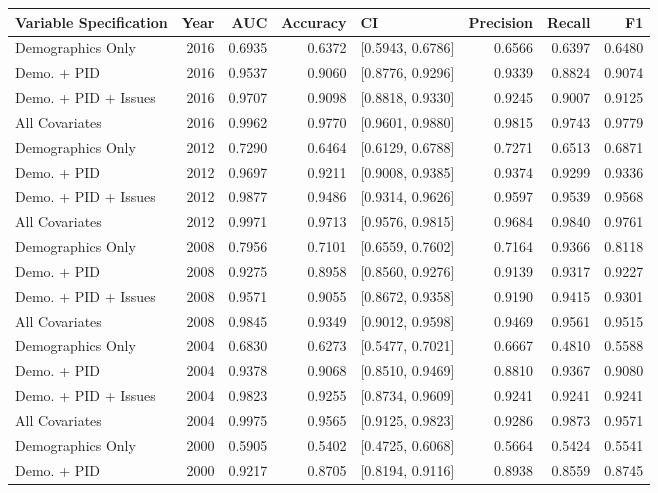 \begin{longtable}{lrrrlrrr}
  \toprule
Variable Specification & Year & AUC & Accuracy & CI & Precision & Recall & F1 \\ 
  \midrule
Demographics Only & 2016 & 0.6935 & 0.6372 & [0.5943, 0.6786] & 0.6566 & 0.6397 & 0.6480 \\ 
  Demo. + PID & 2016 & 0.9537 & 0.9060 & [0.8776, 0.9296] & 0.9339 & 0.8824 & 0.9074 \\ 
  Demo. + PID + Issues & 2016 & 0.9707 & 0.9098 & [0.8818, 0.9330] & 0.9245 & 0.9007 & 0.9125 \\ 
  All Covariates & 2016 & 0.9962 & 0.9770 & [0.9601, 0.9880] & 0.9815 & 0.9743 & 0.9779 \\ 
  Demographics Only & 2012 & 0.7290 & 0.6464 & [0.6129, 0.6788] & 0.7271 & 0.6513 & 0.6871 \\ 
  Demo. + PID & 2012 & 0.9697 & 0.9211 & [0.9008, 0.9385] & 0.9374 & 0.9299 & 0.9336 \\ 
  Demo. + PID + Issues & 2012 & 0.9877 & 0.9486 & [0.9314, 0.9626] & 0.9597 & 0.9539 & 0.9568 \\ 
  All Covariates & 2012 & 0.9971 & 0.9713 & [0.9576, 0.9815] & 0.9684 & 0.9840 & 0.9761 \\ 
  Demographics Only & 2008 & 0.7956 & 0.7101 & [0.6559, 0.7602] & 0.7164 & 0.9366 & 0.8118 \\ 
  Demo. + PID & 2008 & 0.9275 & 0.8958 & [0.8560, 0.9276] & 0.9139 & 0.9317 & 0.9227 \\ 
  Demo. + PID + Issues & 2008 & 0.9571 & 0.9055 & [0.8672, 0.9358] & 0.9190 & 0.9415 & 0.9301 \\ 
  All Covariates & 2008 & 0.9845 & 0.9349 & [0.9012, 0.9598] & 0.9469 & 0.9561 & 0.9515 \\ 
  Demographics Only & 2004 & 0.6830 & 0.6273 & [0.5477, 0.7021] & 0.6667 & 0.4810 & 0.5588 \\ 
  Demo. + PID & 2004 & 0.9378 & 0.9068 & [0.8510, 0.9469] & 0.8810 & 0.9367 & 0.9080 \\ 
  Demo. + PID + Issues & 2004 & 0.9823 & 0.9255 & [0.8734, 0.9609] & 0.9241 & 0.9241 & 0.9241 \\ 
  All Covariates & 2004 & 0.9975 & 0.9565 & [0.9125, 0.9823] & 0.9286 & 0.9873 & 0.9571 \\ 
  Demographics Only & 2000 & 0.5905 & 0.5402 & [0.4725, 0.6068] & 0.5664 & 0.5424 & 0.5541 \\ 
  Demo. + PID & 2000 & 0.9217 & 0.8705 & [0.8194, 0.9116] & 0.8938 & 0.8559 & 0.8745 \\ 

\end{longtable}
